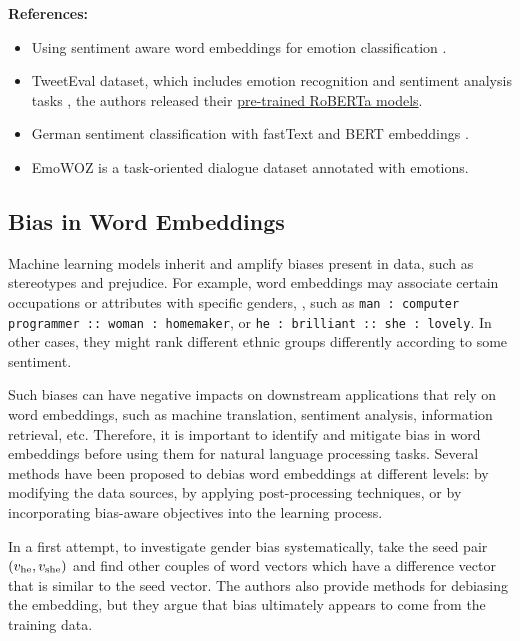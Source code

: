 \documentclass[11pt, a4paper]{amsart}
\begin{document}
\noindent \textbf{References:}
\begin{itemize}
	\item Using sentiment aware word embeddings for emotion classification \cite{sentiment-aware-word-embedding-emotion-2019}.
	\item TweetEval dataset, which includes emotion recognition and sentiment analysis tasks \cite{barbieri-etal-2020-tweeteval}, the authors released their \href{https://huggingface.co/cardiffnlp/twitter-roberta-base-sentiment}{pre-trained RoBERTa models}.
	\item German sentiment classification with fastText and BERT embeddings \cite{guhr-etal-2020-training}.
	\item EmoWOZ \cite{DBLP:journals/corr/abs-2109-04919} is a task-oriented dialogue dataset annotated with emotions.
\end{itemize}


\subsection{Bias in Word Embeddings}

Machine learning models inherit and amplify biases present in data, such as stereotypes and prejudice.
For example, word embeddings may associate certain occupations or attributes with specific genders, \cite{DBLP:journals/corr/BolukbasiCZSK16a}, such as \texttt{man : computer programmer :: woman : homemaker}, or \texttt{he : brilliant :: she : lovely}.
In other cases, they might rank different ethnic groups differently according to some sentiment.

Such biases can have negative impacts on downstream applications that rely on word embeddings, such as machine translation, sentiment analysis, information retrieval, etc.
Therefore, it is important to identify and mitigate bias in word embeddings before using them for natural language processing tasks.
Several methods have been proposed to debias word embeddings at different levels: by modifying the data sources, by applying post-processing techniques, or by incorporating bias-aware objectives into the learning process.

In a first attempt, to investigate gender bias systematically, \cite{DBLP:journals/corr/BolukbasiCZSK16a} take the seed pair $(v_\textup{he}, v_\textup{she})$ and find other couples of word vectors which have a difference vector that is similar to the seed vector.
The authors also provide methods for debiasing the embedding, but they argue that bias ultimately appears to come from the training data.
\end{document}
